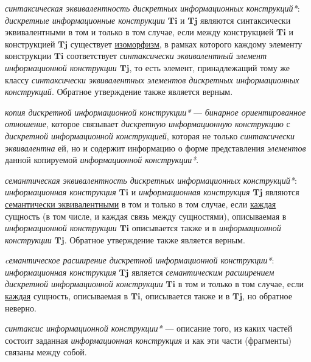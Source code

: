 \textit{синтаксическая эквивалентность дискретных информационных конструкций*}: \textit{дискретные информационные конструкции} $\bm{Ti}$ и $\bm{Tj}$ являются синтаксически эквивалентными в том и только в том случае, если между конструкцией \textit{$\bm{Ti}$} и конструкцией \textit{$\bm{Tj}$} существует \underline{изоморфизм}, в рамках которого каждому элементу конструкции \textit{$\bm{Ti}$} соответствует \textit{синтаксически эквивалентный элемент информационной конструкции} \textit{$\bm{Tj}$}, то есть элемент, принадлежащий тому же классу \textit{синтаксически эквивалентных} \textit{элементов дискретных информационных конструкций}.
Обратное утверждение также является верным.

\textit{копия дискретной информационной конструкции*} --- \textit{бинарное ориентированное отношение}, которое связывает \textit{дискретную информационную конструкцию} с \textit{дискретной информационной конструкцией}, которая не только \textit{синтаксически эквивалентна} ей, но и содержит информацию о форме представления \textit{элементов} данной копируемой \textit{информационной конструкции*}.

\begin{SCn}
\end{SCn}

\textit{семантическая эквивалентность дискретных информационных конструкций*}: \textit{информационная конструкция} \textit{$\bm{Ti}$} и \textit{информационная конструкция} \textit{$\bm{Tj}$} являются \underline{семантически эквивалентными} в том и только в том случае, если \underline{каждая} сущность (в том числе, и каждая связь между сущностями), описываемая в \textit{информационной конструкции} \textit{$\bm{Ti}$} описывается также и в \textit{информационной конструкции} \textit{$\bm{Tj}$}.
Обратное утверждение также является верным.

\textit{cемантическое расширение дискретной информационной конструкции*}: \textit{информационная конструкция} \textit{$\bm{Tj}$} является \textit{семантическим расширением дискретной информационной конструкции} \textit{$\bm{Ti}$} в том и только в том случае, если \underline{каждая} сущность, описываемая в \textit{$\bm{Ti}$}, описывается также и в \textit{$\bm{Tj}$}, но обратное неверно.

\textit{синтаксис информационной конструкции*} --- описание того, из каких частей состоит заданная \textit{информационная конструкция} и как эти части (фрагменты) связаны между собой.

